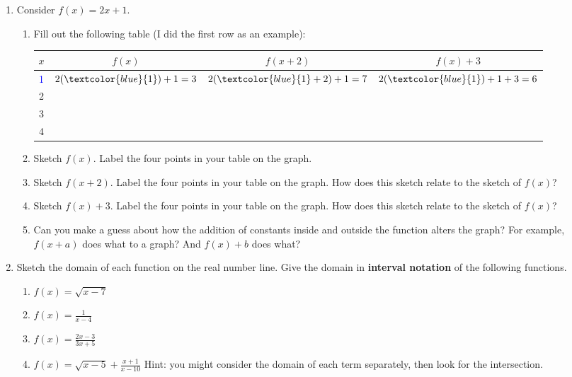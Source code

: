 \documentclass[12pt]{amsart}
\begin{document}
\begin{enumerate}
\item Consider $f(x)=2x+1$.
\begin{enumerate}
\item
Fill out the following table (I did the first row as an example):
\begin{center}
 \begin{tabular}{||c c c c||} 
 \hline
 $x$ & $f(x)$  &$f(x+2)$ & $f(x)+3$\\ [0.5ex] 
 \hline\hline
\textcolor{blue} {1} & $2(\textcolor{blue}{1})+1 =3$ & $2(\textcolor{blue}{1}+2)+1=7$ & $2(\textcolor{blue}{1})+1 +3=6$ \\ 
 \hline
 2 & & &  \\
 \hline
 3 & & &  \\
 \hline
 4 & & &  \\
    \hline
\end{tabular}
\end{center}      

\item Sketch $f(x)$.   Label the four points in your table on the graph.
\item Sketch $f(x+2)$.  Label the four points in your table on the graph.  How does this sketch relate to the sketch of $f(x)$?
\item Sketch $f(x)+3$.    Label the four points in your table on the graph.  How does this sketch relate to the sketch of $f(x)$?
\item Can you make a guess about how the addition of constants inside and outside the function alters the graph?  For example, $f(x+a)$ does what to a graph?  And $f(x) + b$ does what?
\end{enumerate}

\item Sketch the domain of each function on the real number line.  Give the domain in \textbf{interval notation} of the following functions.
\begin{enumerate}
\item $f(x)=\sqrt{x-7}$
\item $f(x)=\frac{1}{x-4}$
\item $f(x) = \frac{2x-3}{3x+5}$
\item $f(x) = \sqrt{x-5} + \frac{x+1}{x-10}$ Hint: you might consider the domain of each term separately, then look for the intersection.
\end{enumerate}


\end{enumerate}
\end{document}

